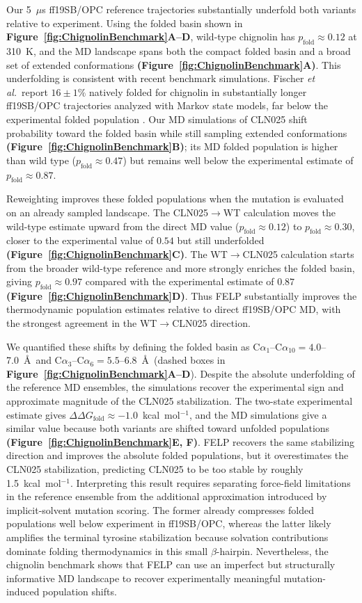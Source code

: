 \documentclass[journal=jctcce,manuscript=article,layout=twocolumn,hyperref=true]{achemso}
\newcommand{\figref}[2][]{\textbf{Figure~\ref{#2}#1}}
\newcommand{\figrefp}[2][]{\textbf{(Figure~\ref{#2}#1)}}
\begin{document}
	Our 5~$\mu$s ff19SB/OPC reference trajectories substantially underfold both variants relative to experiment. Using the folded basin shown in \figref[A--D]{fig:ChignolinBenchmark}, wild-type chignolin has $p_{\mathrm{fold}}\approx0.12$ at 310~K, and the MD landscape spans both the compact folded basin and a broad set of extended conformations \figrefp[A]{fig:ChignolinBenchmark}. This underfolding is consistent with recent benchmark simulations. Fischer \textit{et al.}\ report $16\pm1\%$ natively folded for chignolin in substantially longer ff19SB/OPC trajectories analyzed with Markov state models, far below the experimental folded population \cite{fischer2024jctc}. Our MD simulations of CLN025 shift probability toward the folded basin while still sampling extended conformations \figrefp[B]{fig:ChignolinBenchmark}; its MD folded population is higher than wild type ($p_{\mathrm{fold}}\approx0.47$) but remains well below the experimental estimate of $p_{\mathrm{fold}}\approx0.87$.
	
	Reweighting improves these folded populations when the mutation is evaluated on an already sampled landscape. The CLN025$\rightarrow$WT calculation moves the wild-type estimate upward from the direct MD value ($p_{\mathrm{fold}}\approx0.12$) to $p_{\mathrm{fold}}\approx0.30$, closer to the experimental value of $0.54$ but still underfolded \figrefp[C]{fig:ChignolinBenchmark}. The WT$\rightarrow$CLN025 calculation starts from the broader wild-type reference and more strongly enriches the folded basin, giving $p_{\mathrm{fold}}\approx0.97$ compared with the experimental estimate of $0.87$ \figrefp[D]{fig:ChignolinBenchmark}. Thus FELP substantially improves the thermodynamic population estimates relative to direct ff19SB/OPC MD, with the strongest agreement in the WT$\rightarrow$CLN025 direction.
	
	We quantified these shifts by defining the folded basin as C$\alpha_1$--C$\alpha_{10}=4.0$--7.0~\AA\ and C$\alpha_3$--C$\alpha_6=5.5$--6.8~\AA\ (dashed boxes in \figref[A--D]{fig:ChignolinBenchmark}). Despite the absolute underfolding of the reference MD ensembles, the simulations recover the experimental sign and approximate magnitude of the CLN025 stabilization. The two-state experimental estimate gives $\Delta\Delta G_{\mathrm{fold}}\approx-1.0$~kcal~mol$^{-1}$, and the MD simulations give a similar value because both variants are shifted toward unfolded populations \figrefp[E, F]{fig:ChignolinBenchmark}. FELP recovers the same stabilizing direction and improves the absolute folded populations, but it overestimates the CLN025 stabilization, predicting CLN025 to be too stable by roughly 1.5~kcal~mol$^{-1}$. Interpreting this result requires separating force-field limitations in the reference ensemble from the additional approximation introduced by implicit-solvent mutation scoring. The former already compresses folded populations well below experiment in ff19SB/OPC, whereas the latter likely amplifies the terminal tyrosine stabilization because solvation contributions dominate folding thermodynamics in this small $\beta$-hairpin. Nevertheless, the chignolin benchmark shows that FELP can use an imperfect but structurally informative MD landscape to recover experimentally meaningful mutation-induced population shifts.
	
\end{document}
